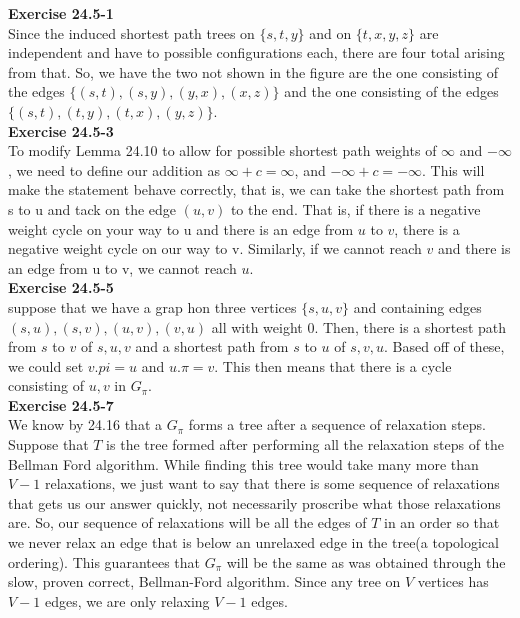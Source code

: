 \documentclass{article}
\begin{document}
\noindent\textbf{Exercise 24.5-1}\\
Since the induced shortest path trees on $\{s,t,y\}$ and on $\{t,x,y,z\}$ are independent and have to possible configurations each, there are four total arising from that. So, we have the two not shown in the figure are the one consisting of the edges $\{(s,t),(s,y),(y,x),(x,z)\}$ and the one consisting of the edges $\{(s,t),(t,y),(t,x),(y,z)\}$.\\

\noindent\textbf{Exercise 24.5-3}\\
To modify Lemma 24.10 to allow for possible shortest path weights of $\infty$ and $-\infty$, we need to define our addition as $\infty + c = \infty$, and $-\infty + c = -\infty$. This will make the statement behave correctly, that is, we can take the shortest path from s to u and tack on the edge $(u,v)$ to the end. That is, if there is a negative weight cycle on your way to u and there is an edge from $u$ to $v$, there is a negative weight cycle on our way to v. Similarly, if we cannot reach $v$ and there is an edge from u to v, we cannot reach $u$.\\

\noindent\textbf{Exercise 24.5-5}\\
suppose that we have a grap hon three vertices $\{s,u,v\}$ and containing edges $(s,u),(s,v),(u,v),(v,u)$ all with weight 0. Then, there is a shortest path from $s$ to $v$ of $s,u,v$ and a shortest path from $s$ to $u$ of $s,v,u$. Based off of these, we could set $v.pi= u$ and $u.\pi = v$. This then means that there is a cycle consisting of $u,v$ in $G_\pi$.\\

\noindent\textbf{Exercise 24.5-7}\\
We know by 24.16 that a $G_\pi$ forms a tree after a sequence of relaxation steps. Suppose that $T$ is the tree formed after performing all the relaxation steps of the Bellman Ford algorithm. While finding this tree would take many more than $V-1$ relaxations, we just want to say that there is some sequence of relaxations that gets us our answer quickly, not necessarily proscribe what those relaxations are. So, our sequence of relaxations will be all the edges of $T$ in an order so that we never relax an edge that is below an unrelaxed edge in the tree(a topological ordering). This guarantees that $G_\pi$ will be the same as was obtained through the slow, proven correct, Bellman-Ford algorithm. Since any tree on $V$ vertices has $V-1$ edges, we are only relaxing $V-1$ edges.\\
\end{document}
